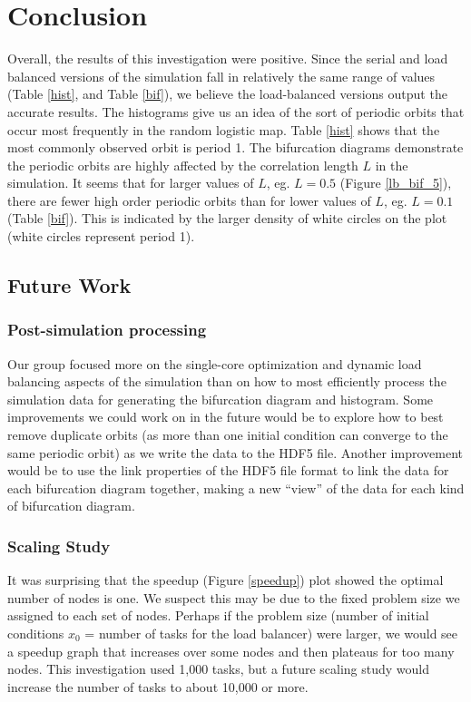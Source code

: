 \documentclass[12pt]{article}
\begin{document}
\section{Conclusion}
Overall, the results of this investigation were positive. Since the
serial and load balanced versions of the simulation fall in relatively
the same range of values (Table \ref{hist}, and Table \ref{bif}), we believe the load-balanced versions output the
accurate results. The histograms give us an idea of the sort of
periodic orbits that occur most frequently in the random logistic
map. Table \ref{hist} shows that the
most commonly observed orbit is period 1. The bifurcation diagrams
demonstrate the periodic orbits are highly affected by the correlation
length $L$ in the simulation. It seems that for larger values of $L$,
eg. $L=0.5$ (Figure \ref{lb_bif_5}), there are fewer high order
periodic orbits than for lower values of $L$, eg. $L=0.1$ (Table \ref{bif}). This is indicated by the
larger density of white circles on the plot (white circles represent
period 1).
\subsection{Future Work}
\subsubsection{Post-simulation processing}
Our group focused more on the single-core optimization and dynamic
load balancing aspects of the simulation than on how to most
efficiently process the simulation data for generating the bifurcation
diagram and histogram. Some improvements we could work on in the
future would be to explore how to best remove duplicate orbits (as
more than one initial condition can converge to the same periodic
orbit) as we write the data to the HDF5 file. Another improvement
would be to use the link properties of the HDF5 file format to link
the data for each bifurcation diagram together, making a new ``view''
of the data for each kind of bifurcation diagram. 
\subsubsection{Scaling Study}
It was surprising that the speedup (Figure \ref{speedup}) plot showed
the optimal number of nodes is one. We suspect this may be due to the
fixed problem size we assigned to each set of nodes. Perhaps if the
problem size (number of initial conditions $x_0$ = number of tasks for
the load balancer) were larger, we would see a speedup graph that
increases over some nodes and then plateaus for too many nodes. This
investigation used 1,000 tasks, but a future scaling study would
increase the number of tasks to about 10,000 or more.
\newpage


\end{document}
